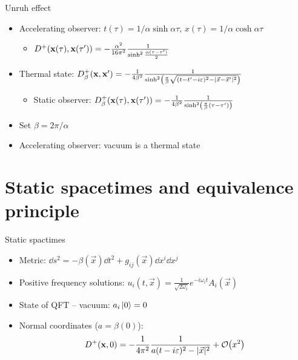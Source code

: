 \documentclass{beamer}
\renewcommand{\va}[1]{\vec{#1}}
\begin{document}
\begin{frame}{Unruh effect}
\begin{itemize}
	\item Accelerating observer: \(t(\tau) = 1/\alpha \sinh \alpha\tau,\,x(\tau) = 1/\alpha \cosh \alpha\tau\)
	\begin{itemize}
		\item \(D^+(\vb{x}(\tau), \vb{x}(\tau')) = -\frac{\alpha^2}{16\pi^2} \frac{1}{\sinh^2\frac{\alpha(\tau-\tau')}{2}}\)
	\end{itemize}
	\item Thermal state: \(D^+_\beta(\vb{x},\vb{x}') = -\frac{1}{4\beta^2} \frac{1}{\sinh[2](\frac{\pi}{\beta}\sqrt{(t-t'-i\varepsilon)^2 - |\va{x}-\va{x}'|^2})}\)
	\begin{itemize}
		\item Static observer: \(D^+_\beta(\vb{x}(\tau),\vb{x}(\tau')) = -\frac{1}{4\beta^2} \frac{1}{\sinh[2](\frac{\pi}{\beta} (\tau-\tau'))}\)
	\end{itemize}
	\item Set \(\beta = 2\pi/\alpha\)
	\item Accelerating observer: vacuum is a thermal state
\end{itemize}
\end{frame}

\frame{\setcounter{tocdepth}{1}\hspace{1cm}\tableofcontents}

\section{Static spacetimes and equivalence principle}
\begin{frame}{Static spactimes}
\begin{itemize}
	\item Metric: \(\dd{s^2} = -\beta(\va{x}) \dd{t^2} + g_{ij}(\va{x}) \dd{x^i} \dd{x^j}\)
	\item Positive frequency solutions: \(u_{i}(t, \va{x}) = \frac{1}{\sqrt{2\omega_i}}e^{-i\omega_i t} A_i(\va{x})\)
	\item State of QFT -- vacuum: \(a_i \ket*{0} = 0\)
	\item Normal coordinates (\(a = \beta(0)\)): \[D^+(\vb{x},0) = -\frac{1}{4\pi^2} \frac{1}{a(t-i\varepsilon)^2 - |\va{x}|^2} + \order{x^2}\]
\end{itemize}
\end{frame}
\end{document}

